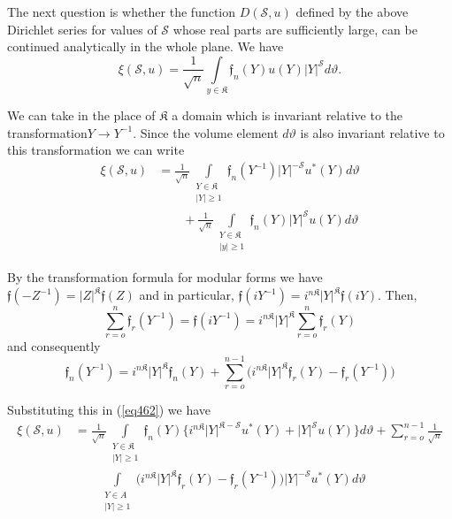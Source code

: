 The next question is whether the function $D(\mathscr{S},u)$ defined
by the above Dirichlet series for values of $\mathscr{S}$ whose real
parts are sufficiently large, can be continued analytically in the
whole plane. We have 
$$
\xi (\mathscr{S},u) = \frac{1}{\sqrt{n}} \int\limits_{y \in
  \mathfrak{K}} \mathfrak{f}_n (Y) u(Y) |Y|^{\mathscr{S}}   d\vartheta. 
$$

We can take in the place of $\mathfrak{K}$ a domain which is invariant
relative to the transformation\pageoriginale $Y \to Y^{-1}$. Since the
volume element $d \vartheta$ is also invariant relative to this
transformation we can write  
\begin{align*}
 \xi (\mathscr{S}, u) & = \frac{1}{\sqrt{n}} \int\limits_{\substack{Y
    \in  \mathfrak{K} \\ | Y |  \ge   1}} \mathfrak{f}_n (Y^{-1}) | Y
|^{-\mathscr{S}} u^* (Y)   d   \vartheta\\
& \qquad  + \frac{1}{\sqrt{n}}
\int\limits_{\substack {Y   \in   \mathfrak{K} \\   | y |   \ge   1}}
\mathfrak{f}_n   (Y)   | Y |^{\mathscr{S}}   u(Y)   d \vartheta
\tag{462}\label{eq462}  
\end{align*}

 By the transformation formula for modular forms we have
 $\mathfrak{f}(-Z^{-1})=|Z |^{\mathfrak{K}} \mathfrak{f} (Z)$ and in
 particular, $\mathfrak{f}   (i Y^{-1}) = i^{n \mathfrak{K}}    | Y
 |^\mathfrak{K}   \mathfrak{f}   (i Y)$. Then,   
 $$
 \sum^n_{r=o}    \mathfrak{f}_{r}   (Y^{-1}) = \mathfrak{f}(iY^{-1})=
 i^{n \mathfrak{K}}   | Y |^{\mathfrak{K}}    \sum^n_{r=o}
 \mathfrak{f}_{r}(Y) 
$$
and consequently 
$$
\mathfrak{f}_n (Y^{-1})= i^{n \mathfrak{K}}   | Y |^{\mathfrak{K}}
\mathfrak{f}_n   (Y) + \sum^{n-1}_{r=o}   \big(i^{n \mathfrak{K}}   |
Y|^{\mathfrak{K}}  \mathfrak{f}_r  (Y)- \mathfrak{f}_r ( Y^{-1}) \big) 
$$

Substituting this in (\ref{eq462}) we have 
\begin{align*}
\xi   (\mathscr{S}, u ) & = \frac{1}{\sqrt{n}}   \int\limits_{\substack{Y
    \in   \mathfrak{K}\\ | Y |   \ge   1}} \mathfrak{f}_n   (Y)\{i^{n
  \mathfrak{K}}   |Y|^{\mathfrak{K}-\mathscr{S}}   u^*(Y) + |
Y|^{\mathscr{S}} u   (Y) \} d \vartheta + \sum^{n-1}_{r=o}
\frac{1}{\sqrt{n}}   \\
& \qquad \int\limits_{\substack{Y   \in   A \\ | Y |   \ge
    1}} \big( i^{n   \mathfrak{K}}   | Y |^{\mathfrak{K}}
\mathfrak{f}_r   (Y)- \mathfrak{f}_{r}   (Y^{-1})\big) |
Y|^{-\mathscr{S}}   u^* (Y)   d \vartheta \tag{463}\label{eq463} 
\end{align*}

